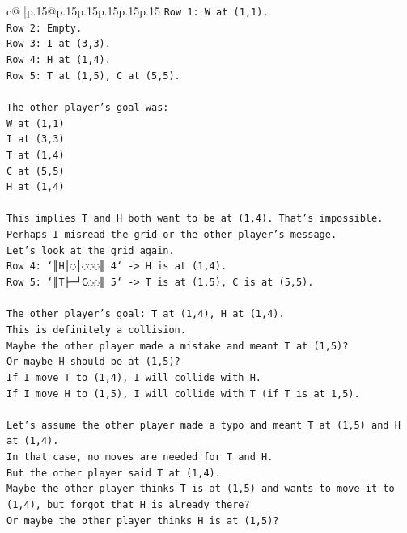 \documentclass{article}
\begin{document}
{\begin{supertabular}{c@{$\;$}|p{.15\linewidth}@{}p{.15\linewidth}p{.15\linewidth}p{.15\linewidth}p{.15\linewidth}p{.15\linewidth}}
{{{\texttt{Row 1: W at (1,1).} \\
\texttt{Row 2: Empty.} \\
\texttt{Row 3: I at (3,3).} \\
\texttt{Row 4: H at (1,4).} \\
\texttt{Row 5: T at (1,5), C at (5,5).} \\
\\ 
\texttt{The other player's goal was:} \\
\texttt{W at (1,1)} \\
\texttt{I at (3,3)} \\
\texttt{T at (1,4)} \\
\texttt{C at (5,5)} \\
\texttt{H at (1,4)} \\
\\ 
\texttt{This implies T and H both want to be at (1,4). That's impossible.} \\
\texttt{Perhaps I misread the grid or the other player's message.} \\
\texttt{Let's look at the grid again.} \\
\texttt{Row 4: `║H│◌│◌◌◌║ 4` {-}> H is at (1,4).} \\
\texttt{Row 5: `║T├─┘C◌◌║ 5` {-}> T is at (1,5), C is at (5,5).} \\
\\ 
\texttt{The other player's goal: T at (1,4), H at (1,4).} \\
\texttt{This is definitely a collision.} \\
\texttt{Maybe the other player made a mistake and meant T at (1,5)?} \\
\texttt{Or maybe H should be at (1,5)?} \\
\texttt{If I move T to (1,4), I will collide with H.} \\
\texttt{If I move H to (1,5), I will collide with T (if T is at 1,5).} \\
\\ 
\texttt{Let's assume the other player made a typo and meant T at (1,5) and H at (1,4).} \\
\texttt{In that case, no moves are needed for T and H.} \\
\texttt{But the other player said T at (1,4).} \\
\texttt{Maybe the other player thinks T is at (1,5) and wants to move it to (1,4), but forgot that H is already there?} \\
\texttt{Or maybe the other player thinks H is at (1,5)?} \\
}}}
\end{supertabular}}
\end{document}
